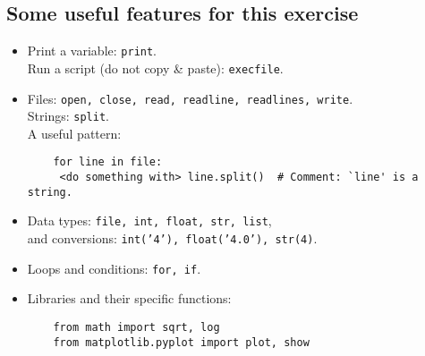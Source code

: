 \documentclass[a4paper,11pt]{article}
\begin{document}
\subsection{Some useful features for this exercise}
\begin{itemize}
\item Print a variable: \texttt{print}. \\
    Run a script (do not copy \& paste): \texttt{execfile}.
\item Files: \texttt{open, close, read, readline, readlines, write}. \\
	Strings: \texttt{split}. \\
      A useful pattern:
	\begin{verbatim}
	for line in file:
     <do something with> line.split()  # Comment: `line' is a string.
	\end{verbatim}
\item Data types: \texttt{file, int, float, str, list}, \\
	  	and conversions: \texttt{int('4'), float('4.0'), str(4)}.
\item Loops and conditions: \texttt{for, if}.
\item Libraries and their specific functions: 
	\begin{verbatim}
	from math import sqrt, log
	from matplotlib.pyplot import plot, show
	\end{verbatim}
\end{itemize}
\end{document}
